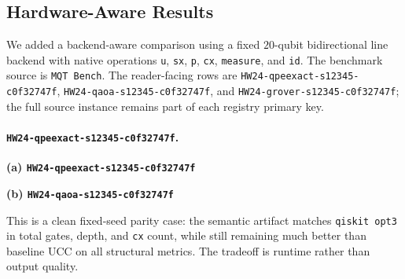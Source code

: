 \subsection{Hardware-Aware Results}

We added a backend-aware comparison using a fixed $20$-qubit bidirectional line backend with native operations \texttt{u}, \texttt{sx}, \texttt{p}, \texttt{cx}, \texttt{measure}, and \texttt{id}. The benchmark source is \texttt{MQT Bench}.  The reader-facing rows are \texttt{HW24-qpeexact-s12345-c0f32747f}, \texttt{HW24-qaoa-s12345-c0f32747f}, and \texttt{HW24-grover-s12345-c0f32747f}; the full source instance remains part of each registry primary key.

\paragraph{\texttt{HW24-qpeexact-s12345-c0f32747f}.}
\begin{table}[!t]
\centering
\begin{minipage}[t]{0.48\textwidth}
\centering
\textbf{(a) \texttt{HW24-qpeexact-s12345-c0f32747f}}\\[2pt]
\end{minipage}\hfill
\begin{minipage}[t]{0.48\textwidth}
\centering
\textbf{(b) \texttt{HW24-qaoa-s12345-c0f32747f}}\\[2pt]
\end{minipage}
\caption{Canonical hardware-aware results for the QPE and QAOA reader labels,
generated from the frozen keyed dataset.}
\label{tab:hw-qpe}
\label{tab:hw-qaoa}
\end{table}

This is a clean fixed-seed parity case: the semantic artifact matches
\texttt{qiskit opt3} in total gates, depth, and \texttt{cx} count, while still
remaining much better than baseline UCC on all structural metrics. The tradeoff
is runtime rather than output quality.

